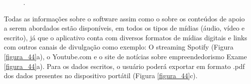 \begin{figure}[H]
.
\label{figura_42}
\end{figure}



Todas as informações sobre o software assim como o sobre os conteúdos de apoio a serem abordados estão disponíveis, em todos os tipos de mídias (áudio, vídeo e escrito), já que o aplicativo conta com diversos formatos de mídias digitais e links com outros canais de divulgação como exemplo: O streaming Spotify (Figura \ref{figura_44}a), o Youtube.com e o site de notícias sobre empreendedorismo Exame \ref{figura_44}a).  Para os dados escritos, o usuário poderá exportar em formato .pdf dos dados presentes no dispositivo portátil (Figura \ref{figura_44}c).

